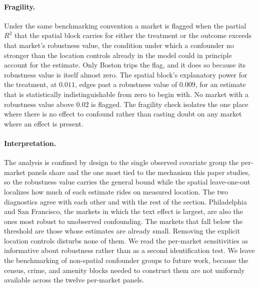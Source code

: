 \paragraph{Fragility.} Under the same benchmarking convention a market is flagged
when the partial $R^2$ that the spatial block carries for either the treatment or
the outcome exceeds that market's robustness value, the condition under which a
confounder no stronger than the location controls already in the model could in
principle account for the estimate. Only Boston trips the flag, and it does so because its robustness value is itself almost zero. The spatial block's explanatory power for the treatment, at $0.011$, edges past a robustness value of $0.009$, for an estimate that is statistically indistinguishable from zero to begin with. No market with a robustness value above $0.02$ is flagged. The fragility check isolates the one place where there is no effect to confound rather than casting doubt on any market where an effect is present.

\paragraph{Interpretation.} The analysis is confined by design to the single
observed covariate group the per-market panels share and the one most tied to the
mechanism this paper studies, so the robustness value carries the general bound
while the spatial leave-one-out localizes how much of each estimate rides on
measured location. The two diagnostics agree with each other and with the rest of
the section. Philadelphia and San Francisco, the markets in which the text effect is largest, are also the ones most robust to unobserved confounding. The markets that fall below the threshold are those whose estimates are already small. Removing the explicit location controls disturbs none of them. We read the per-market sensitivities as informative about robustness rather than as a second identification test. We leave the benchmarking of non-spatial confounder groups to future work, because the census, crime, and amenity blocks needed to construct them are not uniformly available across the twelve per-market panels.


